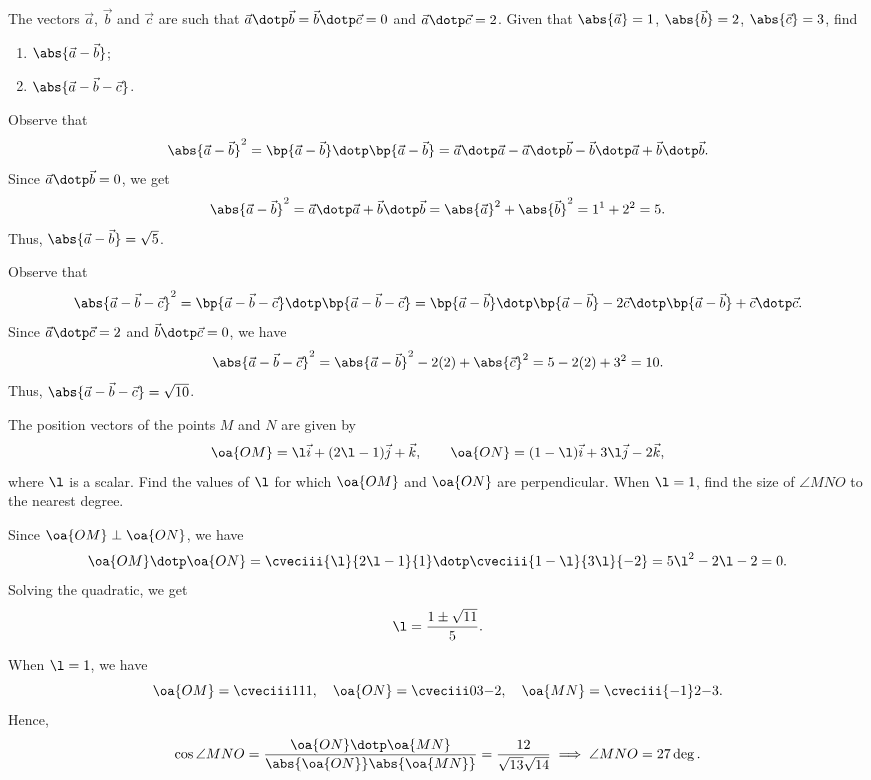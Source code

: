 \begin{problem}
    The vectors $\vec a$, $\vec b$ and $\vec c$ are such that $\vec a \dotp \vec b = \vec b \dotp \vec c = 0$ and $\vec a \dotp \vec c = 2$. Given that $\abs{\vec a} = 1$, $\abs{\vec b} = 2$, $\abs{\vec c} = 3$, find
    \begin{enumerate}
        \item $\abs{\vec a - \vec b}$;
        \item $\abs{\vec a - \vec b - \vec c}$.
    \end{enumerate}
\end{problem}
\begin{solution}
    \begin{ppart}
        Observe that \[\abs{\vec a - \vec b}^2 = \bp{\vec a - \vec b} \dotp \bp{\vec a - \vec b} = \vec a \dotp \vec a - \vec a \dotp \vec b - \vec b \dotp \vec a + \vec b \dotp \vec b.\] Since  $\vec a \dotp \vec b = 0$, we get \[\abs{\vec a - \vec b}^2 = \vec a \dotp \vec a + \vec b \dotp \vec b = \abs{\vec a}^2 + \abs{\vec b}^2 = 1^1 + 2^2 = 5.\] Thus, $\abs{\vec a - \vec b} = \sqrt5$.
    \end{ppart}
    \begin{ppart}
        Observe that \[\abs{\vec a- \vec b - \vec c}^2 = \bp{\vec a - \vec b - \vec c}\dotp \bp{\vec a - \vec b - \vec c} = \bp{\vec a - \vec b} \dotp \bp{\vec a - \vec b} - 2\vec c \dotp \bp{\vec a - \vec b} + \vec c \dotp \vec c.\] Since $\vec a \dotp \vec c = 2$ and $\vec b \dotp \vec c = 0$, we have \[\abs{\vec a- \vec b - \vec c}^2 = \abs{\vec a - \vec b}^2 -2(2) + \abs{\vec c}^2 = 5 - 2(2) + 3^2 = 10.\] Thus, $\abs{\vec a - \vec b - \vec c} = \sqrt{10}$.
    \end{ppart}
\end{solution}

\begin{problem}
    The position vectors of the points $M$ and $N$ are given by \[\oa{OM} = \l \vec i + (2\l - 1) \vec j + \vec k, \qquad \oa{ON} = (1-\l) \vec i + 3\l \vec j - 2 \vec k,\] where $\l$ is a scalar. Find the values of $\l$ for which $\oa{OM}$ and $\oa{ON}$ are perpendicular. When $\l = 1$, find the size of $\angle MNO$ to the nearest degree.
\end{problem}
\begin{solution}
    Since $\oa{OM} \perp \oa{ON}$, we have \[\oa{OM} \dotp \oa{ON} = \cveciii{\l}{2\l - 1}{1} \dotp \cveciii{1-\l}{3\l}{-2} = 5\l^2 - 2\l -2 = 0.\] Solving the quadratic, we get \[\l = \frac{1 \pm \sqrt{11}}{5}.\]

    When $\l = 1$, we have \[\oa{OM} = \cveciii111, \quad \oa{ON} = \cveciii03{-2}, \quad \oa{MN} = \cveciii{-1}2{-3}.\] Hence, \[\cos \angle MNO = \frac{\oa{ON} \dotp \oa{MN}}{\abs{\oa{ON}} \abs{\oa{MN}}} = \frac{12}{\sqrt{13} \sqrt{14}} \implies \angle MNO = 27\deg.\]
\end{solution}

